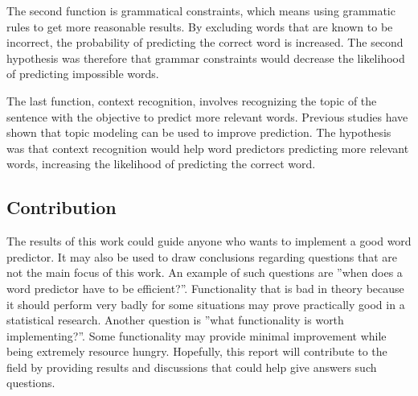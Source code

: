 The second function is grammatical constraints, which means using grammatic rules to get more reasonable results. By excluding words that are known to be incorrect, the probability of predicting the correct word is increased. The second hypothesis was therefore that grammar constraints would decrease the likelihood of predicting impossible words.

The last function, context recognition, involves recognizing the topic of the sentence with the objective to predict more relevant words. Previous studies have shown that topic modeling can be used to improve prediction\cite{DBLP:journals/corr/cs-CL-0009027}\cite{keystrokes}. The hypothesis was that context recognition would help word predictors predicting more relevant words, increasing the likelihood of predicting the correct word.

\subsection{Contribution}
The results of this work could guide anyone who wants to implement a good word predictor. It may also be used to draw conclusions regarding questions that are not the main focus of this work. An example of such questions are ''when does a word predictor have to be efficient?''. Functionality that is bad in theory because it should perform very badly for some situations may prove practically good in a statistical research. Another question is ''what functionality is worth implementing?''. Some functionality may provide minimal improvement while being extremely resource hungry. Hopefully, this report will contribute to the field by providing results and discussions that could help give answers such questions.
